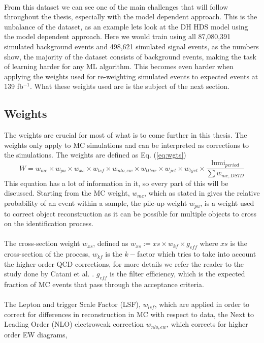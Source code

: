 \documentclass[12pt, a4paper]{book}
\begin{document}
\\From this dataset we can see one of the main challenges that will follow throughout the thesis, especially with the model dependent approach. This is the unbalance of the dataset, as an example lets look at the DH HDS model using the model dependent approach. Here we would train using all 87,080,391 simulated background events and 498,621 simulated signal events, as the numbers 
show, the majority of the dataset consists of background events, making the task of learning harder for any ML algorithm. This becomes even harder when applying the weights used for re-weighting simulated events to expected events at 139 fb$^{-1}$. What these weights used are is the subject of the next section.

\subsection{Weights}\label{sec:wgts}
The weights are crucial for most of what is to come further in this thesis. The weights only apply to MC simulations and can be interpreted as corrections to the simulations. The weights are defined as Eq. (\ref{eq:wgts})
\begin{equation}\label{eq:wgts}
   W = w_{mc}\times w_{pu}\times w_{xs}\times w_{lsf} \times w_{nlo,ew} \times w_{ttbar} \times w_{jet} \times w_{bjet} \times \frac{\text{lumi}_{period}}{\sum w_{mc, DSID}}
\end{equation}
This equation has a lot of information in it, so every part of this will be discussed. Starting from the MC weight, $w_{mc}$, which as stated in \cite{Pythia} gives the relative probability of an event within a sample, the pile-up weight $w_{pu}$, is a weight used to correct object reconstruction as it can be possible for multiple objects to cross on the 
identification process. \cite{Soyez:2018opl}\\ 
\\The cross-section weight $w_{xs}$, defined as $w_{xs} := xs \times w_{kf} \times g_{eff}$ where $xs$ is the cross-section of the process, $w_{kf}$ is the $k-$factor which tries to take into account the higher-order QCD corrections, 
for more details we refer the reader to the study done by Catani et al. \cite{Catani:2001cr}. $g_{eff}$ is the filter efficiency, which is the expected fraction of MC events that pass through the acceptance criteria.\\
\\The Lepton and trigger Scale Factor (LSF), $w_{lsf}$, which are applied in order to correct for differences in reconstruction in MC with respect to data, the Next to Leading Order (NLO) electroweak correction $w_{nlo,ew}$, which corrects for higher order EW diagrams, 
\end{document}
